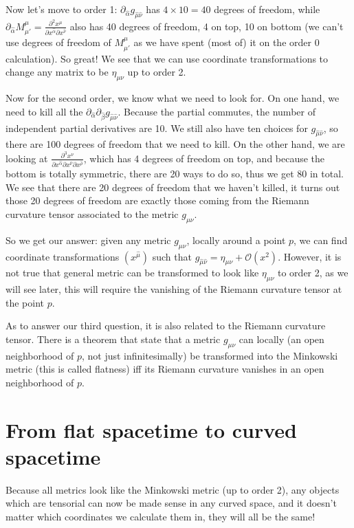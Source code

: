 \documentclass[10pt]{article}
\newcommand{\xm}{x^\mu}
\newcommand{\xn}{x^\nu}
\newcommand{\gmn}{g_{\mu \nu}}
\newcommand{\gmnhat}{g_{\hat{\mu} \hat{\nu}}}
\newcommand{\emn}{\eta_{\mu \nu}}
\begin{document}
Now let's move to order 1: $\partial_{\hat{\alpha}} \gmnhat$ has $4 \times 10 = 40$ degrees of freedom, while $\partial_{\hat{\alpha}} M^{\mu}_{\mu'} = \frac{\partial^2 \xm}{\partial x^{\hat{\alpha}} \partial x^{\hat{\nu}}}$ also has 40 degrees of freedom, 4 on top, 10 on bottom (we can't use degrees of freedom of $M^{\mu}_{\mu'}$ as we have spent (most of) it on the order 0 calculation). So great! We see that we can use coordinate transformations to change any matrix to be $\emn$ up to order 2.

Now for the second order, we know what we need to look for. On one hand, we need to kill all the $\partial_{\hat{\alpha}} \partial_{\hat{\beta}} \gmnhat$. Because the partial commutes, the number of independent partial derivatives are 10. We still also have ten choices for $\gmnhat$, so there are 100 degrees of freedom that we need to kill. On the other hand, we are looking at 
$\frac{\partial^3 \xn}{\partial x^{\hat{\alpha}} \partial x^{\hat{\nu}} \partial x^{\hat{\rho}}}$, which has 4 degrees of freedom on top, and because the bottom is totally symmetric, there are 20 ways to do so, thus we get 80 in total. We see that there are 20 degrees of freedom that we haven't killed, it turns out those 20 degrees of freedom are exactly those coming from the Riemann curvature tensor associated to the metric $\gmn$. 

So we get our answer: given any metric $\gmn$, locally around a point $p$, we can find coordinate transformations $(x^{\hat{\mu}})$ such that $\gmnhat = \emn + \mathcal{O}(x^2)$. However, it is not true that general metric can be transformed to look like $\emn$ to order 2, as we will see later, this will require the vanishing of the Riemann curvature tensor at the point $p$.

As to answer our third question, it is also related to the Riemann curvature tensor. There is a theorem that state that a metric $\gmn$ can locally (an open neighborhood of $p$, not just infinitesimally) be transformed into the Minkowski metric (this is called flatness) iff its Riemann curvature vanishes in an open neighborhood of $p$.

\section {From flat spacetime to curved spacetime}\label{sec:class_style}

Because all metrics look like the Minkowski metric (up to order 2), any objects which are tensorial can now be made sense in any curved space, and it doesn't matter which coordinates we calculate them in, they will all be the same!
\end{document}
